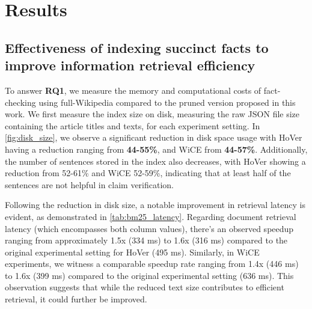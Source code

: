 \section{Results}
\label{sec:results}

\subsection{Effectiveness of indexing succinct facts to improve information retrieval efficiency} To answer \textbf{RQ1}, we measure the memory and computational costs of fact-checking using full-Wikipedia compared to the pruned version proposed in this work. We first measure the index size on disk, measuring the raw JSON file size containing the article titles and texts, for each experiment setting. In \autoref{fig:disk_size}, we observe a significant reduction in disk space usage with HoVer having a reduction ranging from \textbf{44-55\%}, and WiCE from \textbf{44-57\%}. Additionally, the number of sentences stored in the index also decreases, with HoVer showing a reduction from 52-61\% and WiCE 52-59\%, indicating that at least half of the sentences are not helpful in claim verification.



 Following the reduction in disk size, a notable improvement in retrieval latency is evident, as demonstrated in \autoref{tab:bm25_latency}.
Regarding document retrieval latency (which encompasses both column values), there's an observed speedup ranging from approximately 1.5x (334 ms) to 1.6x (316 ms) compared to the original experimental setting for HoVer (495 ms). Similarly, in WiCE experiments, we witness a comparable speedup rate ranging from 1.4x (446 ms) to 1.6x (399 ms) compared to the original experimental setting (636 ms). This observation suggests that while the reduced text size contributes to efficient retrieval, it could further be improved.



% 


